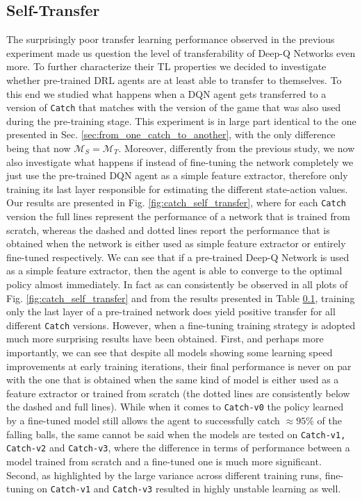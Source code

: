 


\subsection{Self-Transfer}

The surprisingly poor transfer learning performance observed in the previous experiment made us question the level of transferability of Deep-Q Networks even more. To further characterize their TL properties we decided to investigate whether pre-trained DRL agents are at least able to transfer to themselves. To this end we studied what happens when a DQN agent gets transferred to a version of \texttt{Catch} that matches with the version of the game that was also used during the pre-training stage. This experiment is in large part identical to the one presented in Sec. \ref{sec:from_one_catch_to_another}, with the only difference being that now $\mathcal{M}_S = \mathcal{M}_T$. Moreover, differently from the previous study, we now also investigate what happens if instead of fine-tuning the network completely we just use the pre-trained DQN agent as a simple feature extractor, therefore only training its last layer responsible for estimating the different state-action values. Our results are presented in Fig. \ref{fig:catch_self_transfer}, where for each \texttt{Catch} version the full lines represent the performance of a network that is trained from scratch, whereas the dashed and dotted lines report the performance that is obtained when the network is either used as simple feature extractor or entirely fine-tuned respectively. We can see that if a pre-trained Deep-Q Network is used as a simple feature extractor, then the agent is able to converge to the optimal policy almost immediately. In fact as can consistently be observed in all plots of Fig. \ref{fig:catch_self_transfer} and from the results presented in Table \ref{}, training only the last layer of a pre-trained network does yield positive transfer for all different \texttt{Catch} versions. However, when a fine-tuning training strategy is adopted much more surprising results have been obtained. First, and perhaps more importantly, we can see that despite all models showing some learning speed improvements at early training iterations, their final performance is never on par with the one that is obtained when the same kind of model is either used as a feature extractor or trained from scratch (the dotted lines are consistently below the dashed and full lines). While when it comes to \texttt{Catch-v0} the policy learned by a fine-tuned model still allows the agent to successfully catch $\approx 95\%$ of the falling balls, the same cannot be said when the models are tested on \texttt{Catch-v1, Catch-v2} and \texttt{Catch-v3}, where the difference in terms of performance between a model trained from scratch and a fine-tuned one is much more significant. Second, as highlighted by the large variance across different training runs, fine-tuning on \texttt{Catch-v1} and \texttt{Catch-v3} resulted in highly unstable learning as well.    


